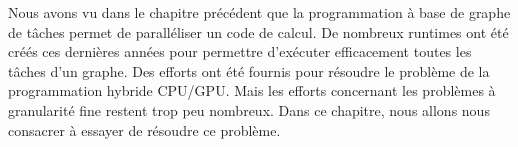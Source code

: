 Nous avons vu dans le chapitre précédent que la programmation à base de graphe de tâches permet de paralléliser un code de calcul.
%
De nombreux runtimes ont été créés ces dernières années pour permettre d'exécuter efficacement toutes les tâches d'un graphe.
%
Des efforts ont été fournis pour résoudre le problème de la programmation hybride CPU/GPU.
%
Mais les efforts concernant les problèmes à granularité fine restent trop peu nombreux.
%
Dans ce chapitre, nous allons nous consacrer à essayer de résoudre ce problème.
